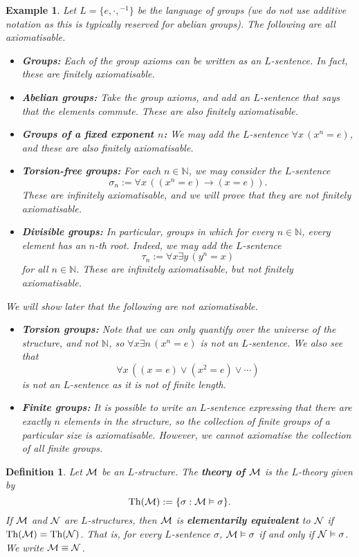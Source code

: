 \documentclass[10pt]{article}
\newcommand{\N}{\mathbb{N}}
\DeclareMathOperator{\Th}{Th}
\theoremstyle{newstyle}
\newtheorem{defn}[thm]{Definition}
\newtheorem{exmp}[thm]{Example}
\begin{document}
\begin{exmp}
Let $L = \{e, \cdot, {}^{-1}\}$ be the language of groups (we do not use 
additive notation as this is typically reserved for abelian groups). The following 
are all axiomatisable.
\begin{itemize}
    \item {\bf Groups:} Each of the group axioms can be written as an $L$-sentence. 
    In fact, these are finitely axiomatisable.
    \item {\bf Abelian groups:} Take the group axioms, and add an $L$-sentence that 
    says that the elements commute. These are also finitely axiomatisable.
    \item {\bf Groups of a fixed exponent $n$:} We may add the $L$-sentence $\forall x \, (x^n = e)$, 
    and these are also finitely axiomatisable. 
    \item {\bf Torsion-free groups:} For each $n \in \N$, we may consider the $L$-sentence 
    \[ \sigma_n := \forall x \, ((x^n = e) \to (x = e)). \] 
    These are infinitely axiomatisable, and we will prove that they are not finitely axiomatisable.
    \item {\bf Divisible groups:} In particular, groups in which for every $n \in \N$, 
    every element has an $n$-th root. Indeed, we may add the $L$-sentence 
    \[ \tau_n := \forall x \exists y \, (y^n = x) \] 
    for all $n \in \N$. These are infinitely axiomatisable, but not finitely axiomatisable. 
\end{itemize}
We will show later that the following are not axiomatisable.
\begin{itemize}
    \item {\bf Torsion groups:} Note that we can only quantify over the universe of the 
    structure, and not $\N$, so $\forall x \exists n \, (x^n = e)$ is not an $L$-sentence.
    We also see that 
    \[ \forall x \, ((x = e) \vee (x^2 = e) \vee \cdots) \] 
    is not an $L$-sentence as it is not of finite length.
    \item {\bf Finite groups:} It is possible to write an $L$-sentence expressing that 
    there are exactly $n$ elements in the structure, so the collection of finite groups of a particular 
    size is axiomatisable. However, we cannot axiomatise the collection of all finite groups.
\end{itemize}
\end{exmp}

\begin{defn}
Let ${\cal M}$ be an $L$-structure. The {\bf theory of ${\cal M}$} is the $L$-theory
given by 
\[ \Th({\cal M}) := \{\sigma : {\cal M} \vDash \sigma\}. \] 
If ${\cal M}$ and ${\cal N}$ are $L$-structures, then ${\cal M}$ is {\bf elementarily equivalent} 
to ${\cal N}$ if $\Th({\cal M}) = \Th({\cal N})$. That is, for every $L$-sentence 
$\sigma$, ${\cal M} \vDash \sigma$ if and only if ${\cal N} \vDash \sigma$. 
We write ${\cal M} \equiv {\cal N}$.
\end{defn}
\end{document}
